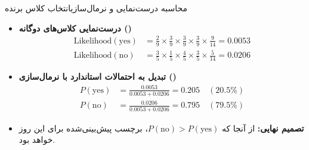 \begin{frame}{محاسبه درست‌نمایی و نرمال‌سازی}{انتخاب کلاس برنده}
  \begin{itemize}
    \setlength{\itemsep}{5pt}
    \item \textbf{درست‌نمایی کلاس‌های دوگانه ()}
    \begin{align*}
      \text{Likelihood}(\text{yes}) &= \frac{2}{9} \times \frac{3}{9} \times \frac{3}{9} \times \frac{3}{9} \times \frac{9}{14} = 0.0053 \\[4pt]
      \text{Likelihood}(\text{no})  &= \frac{3}{5} \times \frac{1}{5} \times \frac{4}{5} \times \frac{3}{5} \times \frac{5}{14} = 0.0206
    \end{align*}
    \item \textbf{تبدیل به احتمالات استاندارد با نرمال‌سازی ()}
    \begin{align*}
      P(\text{yes}) &= \frac{0.0053}{0.0053 + 0.0206} = 0.205 \quad (20.5\%) \\[4pt]
      P(\text{no})  &= \frac{0.0206}{0.0053 + 0.0206} = 0.795 \quad (79.5\%)
    \end{align*}
    \item \textbf{تصمیم نهایی:} از آنجا که $P(\text{no}) > P(\text{yes})$، برچسب پیش‌بینی‌شده برای این روز \textbf{} خواهد بود.
  \end{itemize}
\end{frame}

